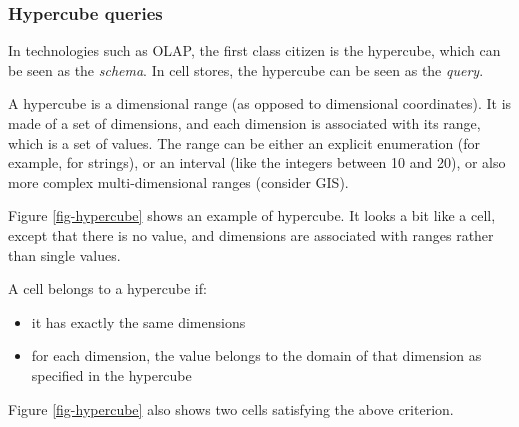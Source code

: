 \documentclass{vldb}
\begin{document}
\subsubsection{Hypercube queries}
In technologies such as OLAP, the first class citizen is the hypercube, which can be seen as the \emph{schema}. In cell stores, the hypercube can be seen as the \emph{query}.

A hypercube is a dimensional range (as opposed to dimensional coordinates). It is made of a set of dimensions, and each dimension is associated with its range, which is a set of values. The range can be either an explicit enumeration (for example, for strings), or an interval (like the integers between 10 and 20), or also more complex multi-dimensional ranges (consider GIS).

Figure \ref{fig-hypercube} shows an example of hypercube. It looks a bit like a cell, except that there is no value, and dimensions are associated with ranges rather than single values.

A cell belongs to a hypercube if:

\begin{itemize}
\item it has exactly the same dimensions
\item for each dimension, the value belongs to the domain of that dimension as specified in the hypercube
\end{itemize}

Figure \ref{fig-hypercube} also shows two cells satisfying the above criterion.
\end{document}
